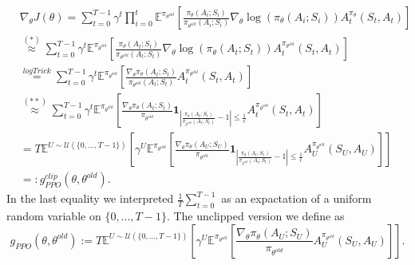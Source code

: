 \documentclass[../main.tex]{subfiles}  %
\begin{document}
\begin{align*}
    &\nabla_\theta J(\theta) = \sum_{t=0}^{T-1} \gamma^t \prod_{i=0}^t \mathbb{E}^{\pi_{\theta^{old}}} [ \frac{\pi_\theta(A_i;S_i) }{\pi_{\theta^{old}} (A_i;S_i)} \nabla_\theta \log (\pi_\theta (A_i;S_i)) A_t^{\pi_\theta} (S_t,A_t)  ]\\
    &\stackrel{(*)}{\approx} \sum_{t=0}^{T-1} \gamma^t \mathbb{E}^{\pi_{\theta^{old}}} [ \frac{\pi_\theta(A_t;S_t) }{\pi_{\theta^{old}} (A_t;S_t)} \nabla_\theta \log (\pi_\theta (A_t;S_t)) A_t^{\pi_{\theta^{old}}} (S_t,A_t)  ]\\
    &\stackrel{logTrick}{=} \sum_{t=0}^{T-1} \gamma^t \mathbb{E}^{\pi_{\theta^{old}}} [ \frac{\nabla_{\theta} \pi_\theta(A_t;S_t) }{\pi_{\theta^{old}} (A_t;S_t)}  A_t^{\pi_{\theta^{old}}} (S_t,A_t)  ]\\
    &\stackrel{(**)}{\approx} \sum_{t=0}^{T-1} \gamma^t \mathbb{E}^{\pi_{\theta^{old}}} [ \frac{\nabla_{\theta} \pi_\theta(A_t;S_t) }{\pi_{\theta^{old}}} \textbf{1}_{\left|  \frac{ \pi_\theta(A_t;S_t) }{\pi_{\theta^{old}} (A_t;S_t)} -1 \right| \leq \frac{1}{\epsilon}}  A_t^{\pi_{\theta^{old}}} (S_t,A_t)  ]\\
    &= T \mathbb{E}^{U \sim \mathcal{U}(\{0,...,T-1\})} \left[  \gamma^U \mathbb{E}^{\pi_{\theta^{old}}} [ \frac{\nabla_{\theta} \pi_\theta(A_U;S_U) }{\pi_{\theta^{old}}} \textbf{1}_{\left|  \frac{ \pi_\theta(A_t;S_t) }{\pi_{\theta^{old}} (A_t;S_t)} -1  \right| \leq \frac{1}{\epsilon}}  A_U^{\pi_{\theta^{old}}} (S_U,A_U)  ] \right]\\
    &=: g_{PPO}^{clip}(\theta,\theta^{old}).
\end{align*}
In the last equality we interpreted $\frac{1}{T} \sum_{t=0}^{T-1}$ as an expactation of a uniform random variable on $\{0,...,T-1\}$. The unclipped version we define as 
\[
g_{PPO}(\theta,\theta^{old}) := T \mathbb{E}^{U \sim \mathcal{U}(\{0,...,T-1\})} \left[  \gamma^U \mathbb{E}^{\pi_{\theta^{old}}} [ \frac{\nabla_{\theta} \pi_\theta(A_U;S_U) }{\pi_{\theta^{old}}}  A_U^{\pi_{\theta^{old}}} (S_U,A_U)  ] \right].
\]
\end{document}
